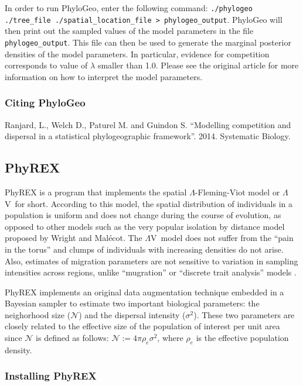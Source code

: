 \documentclass[a4paper,12pt]{article}
\newcommand{\x}[1]{\texttt{#1}}
\newcommand{\sfv}{$\Lambda$V}
\begin{document}
In order to run PhyloGeo, enter the following command: \x{./phylogeo ./tree\_file
  ./spatial\_location\_file > phylogeo\_output}.
PhyloGeo will then print out the sampled values of the model parameters in the file
\x{phylogeo\_output}. This file can then be used to generate the marginal posterior densities of the
model parameters. In particular, evidence for competition corresponds to value of $\lambda$ smaller
than 1.0. Please see the original article for more information on how to interpret the model
parameters.

\subsubsection{Citing PhyloGeo}\label{sec:citephylogeo}

Ranjard, L., Welch D., Paturel M. and Guindon S. ``Modelling competition  and  dispersal in a
statistical phylogeographic framework''. 2014. Systematic Biology.



\subsection{PhyREX} PhyREX is a program that implements the spatial
$\Lambda$-Fleming-Viot model
\cite{etheridge2008,berestycki2009,barton2010,barton2010b,veber2012,barton2013} or \sfv\ for short. 
According to this model, the spatial distribution of individuals in a population is uniform and does
not change during the course of evolution, as opposed to other models such as the very popular
isolation by distance model proposed by Wright and Mal\'ecot. The \sfv\ model  does not
suffer from the ``pain in the torus'' \cite{felsenstein1975} and clumps of individuals with
increasing densities do not arise. Also, estimates of migration parameters are not sensitive to
variation in sampling intensities across regions, unlike ``mugration'' or ``discrete trait
analysis'' models \cite{lemey2009}.

PhyREX implements an original data augmentation technique embedded in a Bayesian sampler to
estimate two important biological parameters: the neighorhood size ($\mathcal{N}$) and the dispersal
intensity ($\sigma^2$). These two parameters are closely related to the effective size of the
population of interest per unit area since $\mathcal{N}$ is defined as follows: $\mathcal{N} := 4\pi
\rho_e \sigma^2$, where $\rho_e$ is the effective population density.

\subsubsection{Installing PhyREX}
\end{document}
